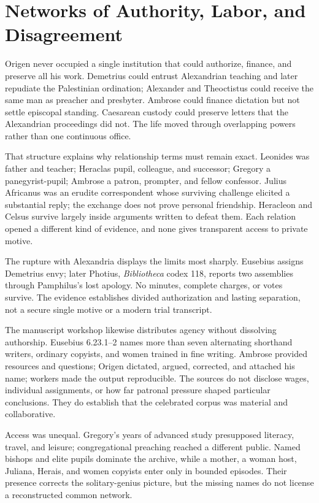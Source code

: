 \section{Networks of Authority, Labor, and Disagreement}
\label{sec:origen-relationships}

Origen never occupied a single institution that could authorize, finance, and
preserve all his work. Demetrius could entrust Alexandrian teaching and later
repudiate the Palestinian ordination; Alexander and Theoctistus could receive
the same man as preacher and presbyter. Ambrose could finance dictation but not
settle episcopal standing. Caesarean custody could preserve letters that the
Alexandrian proceedings did not. The life moved through overlapping powers
rather than one continuous office.

That structure explains why relationship terms must remain exact. Leonides was
father and teacher; Heraclas pupil, colleague, and successor; Gregory a
panegyrist-pupil; Ambrose a patron, prompter, and fellow confessor. Julius
Africanus was an erudite correspondent whose surviving challenge elicited a
substantial reply; the exchange does not prove personal friendship. Heracleon
and Celsus survive largely inside arguments written to defeat them. Each
relation opened a different kind of evidence, and none gives transparent access
to private motive.

The rupture with Alexandria displays the limits most sharply. Eusebius assigns
Demetrius envy; later Photius, \emph{Bibliotheca} codex 118, reports two
assemblies through Pamphilus's lost apology. No minutes, complete charges, or
votes survive. The evidence establishes divided authorization and lasting
separation, not a secure single motive or a modern trial transcript.

The manuscript workshop likewise distributes agency without dissolving
authorship. Eusebius 6.23.1--2 names more than seven alternating shorthand
writers, ordinary copyists, and women trained in fine writing. Ambrose provided
resources and questions; Origen dictated, argued, corrected, and attached his
name; workers made the output reproducible. The sources do not disclose wages,
individual assignments, or how far patronal pressure shaped particular
conclusions. They do establish that the celebrated corpus was material and
collaborative.

Access was unequal. Gregory's years of advanced study presupposed literacy,
travel, and leisure; congregational preaching reached a different public.
Named bishops and elite pupils dominate the archive, while a mother, a woman
host, Juliana, Herais, and women copyists enter only in bounded episodes. Their
presence corrects the solitary-genius picture, but the missing names do not
license a reconstructed common network.

